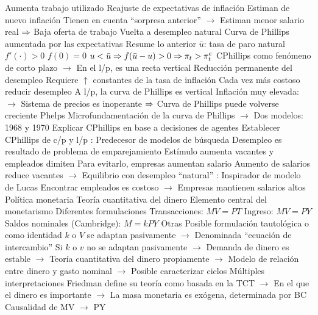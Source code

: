 \documentclass{nuevotema}
\begin{document}
\begin{esquemal}
				\4[] Aumenta trabajo utilizado
				\4 Reajuste de expectativas de inflación
				\4[] Estiman de nuevo inflación
				\4[] Tienen en cuenta ``sorpresa anterior''
				\4[] $\to$ Estiman menor salario real
				\4[] $\then$ Baja oferta de trabajo
				\4[$\then$] Vuelta a desempleo natural
				\4 Curva de Phillips aumentada por las expectativas
				\4[] Resume lo anterior
				\4[] 
				\4[] $\bar{u}$: tasa de paro natural
				\4[] $f'(\cdot) > 0$
				\4[] $f(0) = 0$
				\4[] $u< \bar{u} \Rightarrow f(\bar{u} - u) > 0 \Rightarrow \pi_t > \pi^e_t$
				\4[] CPhillips como fenómeno de corto plazo
				\4[] $\to$ En el l/p, es una recta vertical
			\3 Reducción permanente del desempleo
				\4 Requiere $\uparrow$ constantes de la tasa de inflación
				\4[] 
				\4 Cada vez más costoso reducir desempleo
				\4 A l/p, la curva de Phillips es vertical
				\4 Inflación muy elevada:
				\4[] $\to$ Sistema de precios es inoperante
				\4[] $\then$ Curva de Phillips puede volverse creciente
			\3 Phelps
				\4 Microfundamentación de la curva de Phillips
				\4[] $\to$ Dos modelos: 1968 y 1970
				\4[] Explicar CPhillips en base a decisiones de agentes
				\4[] Establecer CPhillips de c/p y l/p
				: Predecesor de modelos de búsqueda
				\4[] Desempleo es resultado de problema de emparejamiento
				\4[] Estímulo aumenta vacantes y empleados dimiten
				\4[] Para evitarlo, empresas aumentan salario
				\4[] Aumento de salarios reduce vacantes
				\4[] $\to$ Equilibrio con desempleo ``natural''
				: Inspirador de modelo de Lucas
				\4 Encontrar empleados es costoso
				\4[] $\to$ Empresas mantienen salarios altos
		\2 Política monetaria
			\3 Teoría cuantitativa del dinero
				\4 Elemento central del monetarismo
				\4 Diferentes formulaciones
				\4[] Transacciones: $MV = PT$
				\4[] Ingreso: $MV = PY$
				\4[] Saldos nominales (Cambridge): $M=kPY$
				\4[] Otras
				\4 Posible formulación tautológica o como identidad
				\4[] $k$ o $V$ se adaptan pasivamente
				\4[] $\to$ Denominada ``ecuación de intercambio''
				\4 Si $k$ o $v$ no se adaptan pasivamente
				\4[] $\to$ Demanda de dinero es estable
				\4[] $\to$ Teoría cuantitativa del dinero propiamente
				\4[] $\to$ Modelo de relación entre dinero y gasto nominal
				\4[] $\to$ Posible caracterizar ciclos
				\4 Múltiples interpretaciones
				\4[] Friedman define su teoría como basada en la TCT
				\4[] $\to$ En el que el dinero es importante
				\4[] $\to$ La masa monetaria es exógena, determinada por BC
				\4[] Causalidad de MV $\to$ PY

\end{esquemal}
\end{document}
